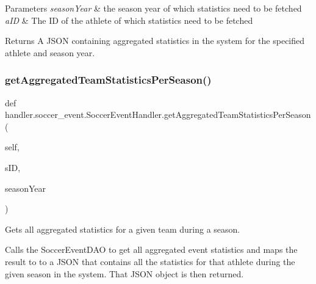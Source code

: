 \begin{DoxyParams}{Parameters}
{\em season\+Year} & the season year of which statistics need to be fetched \\
\hline
{\em a\+ID} & The ID of the athlete of which statistics need to be fetched\\
\hline
\end{DoxyParams}
\begin{DoxyReturn}{Returns}
A J\+S\+ON containing aggregated statistics in the system for the specified athlete and season year. 
\end{DoxyReturn}
\mbox{\label{classhandler_1_1soccer__event_1_1_soccer_event_handler_a48ea25068c4b1e0a2b7c422ffde73abf}} 
\subsubsection{\texorpdfstring{get\+Aggregated\+Team\+Statistics\+Per\+Season()}{getAggregatedTeamStatisticsPerSeason()}}
{\footnotesize\ttfamily def handler.\+soccer\+\_\+event.\+Soccer\+Event\+Handler.\+get\+Aggregated\+Team\+Statistics\+Per\+Season (\begin{DoxyParamCaption}\item[{}]{self,  }\item[{}]{s\+ID,  }\item[{}]{season\+Year }\end{DoxyParamCaption})}



Gets all aggregated statistics for a given team during a season. 

Calls the Soccer\+Event\+D\+AO to get all aggregated event statistics and maps the result to to a J\+S\+ON that contains all the statistics for that athlete during the given season in the system. That J\+S\+ON object is then returned.


